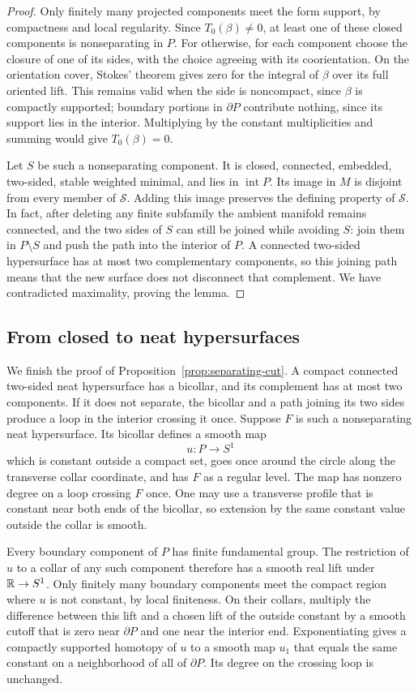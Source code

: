 \begin{proof}
Only finitely many projected components meet the form support, by
compactness and local regularity. Since $T_0(\beta)\ne0$, at least
one of these closed components is nonseparating in $P$. For otherwise,
for each component choose the closure of one of its sides, with the
choice agreeing with its coorientation. On the orientation cover,
Stokes' theorem gives zero for the integral of $\beta$ over its full
oriented lift. This remains valid when the side is noncompact, since
$\beta$ is compactly supported; boundary portions in $\partial P$
contribute nothing, since its support lies in the interior. Multiplying
by the constant multiplicities and summing would give $T_0(\beta)=0$.

Let $S$ be such a nonseparating component. It is closed, connected,
embedded, two-sided, stable weighted minimal, and lies in
$\operatorname{int}P$. Its image in $M$ is disjoint from every member
of $\mathcal S$. Adding this image preserves the defining property of
$\mathcal S$. In fact, after deleting any finite subfamily the ambient
manifold remains connected, and the two sides of $S$ can still be joined
while avoiding $S$: join them in $P\setminus S$ and push the path into
the interior of $P$. A connected two-sided hypersurface has at most two
complementary components, so this joining path means that the new
surface does not disconnect that complement. We have contradicted
maximality, proving the lemma.
\end{proof}

\subsection{From closed to neat hypersurfaces}

We finish the proof of Proposition~\ref{prop:separating-cut}. A compact
connected two-sided neat hypersurface has a bicollar, and its complement
has at most two components. If it does not separate, the bicollar and
a path joining its two sides produce a loop in the interior crossing it
once. Suppose $F$ is such a nonseparating neat hypersurface. Its bicollar
defines a smooth map
\[
u:P\longrightarrow S^1
\]
which is constant outside a compact set, goes once around the circle
along the transverse collar coordinate, and has $F$ as a regular level.
The map has nonzero degree on a loop crossing $F$ once. One may use a
transverse profile that is constant near both ends of the bicollar, so
extension by the same constant value outside the collar is smooth.

Every boundary component of $P$ has finite fundamental group. The
restriction of $u$ to a collar of any such component therefore has a
smooth real lift under $\mathbb R\to S^1$. Only finitely many boundary
components meet the compact region where $u$ is not constant, by local
finiteness. On their collars, multiply the difference between this lift
and a chosen lift of the outside constant by a smooth cutoff that is
zero near $\partial P$ and one near the interior end. Exponentiating
gives a compactly supported homotopy of $u$ to a smooth map $u_1$ that
equals the same constant on a neighborhood of all of $\partial P$.
Its degree on the crossing loop is unchanged.

